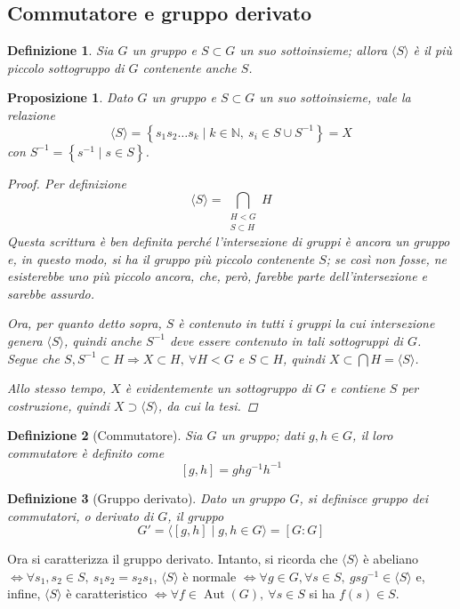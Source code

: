 \documentclass[12pt]{scrartcl}
\theoremstyle{style}
\newtheorem{definizione}{Definizione}[section]
\newtheorem{prop}{Proposizione}[section]
\numberwithin{equation}{subsection}
\begin{document}
\subsection{Commutatore e gruppo derivato}


\begin{definizione}
	Sia $G$ un gruppo e $S \subset G$ un suo sottoinsieme; allora $\langle S \rangle$ \`e il pi\`u piccolo sottogruppo di $G$ contenente anche $S$.
\end{definizione}
\begin{prop}
	Dato $G$ un gruppo e $S \subset G$ un suo sottoinsieme, vale la relazione
	\[
	\langle S \rangle= \left\{ s_1s_2 \ldots s_k  \mid k \in \mathbb{N}, \ s_i \in S \cup S^{-1} \right\} = X
	\] 
	con $S^{-1}= \left\{ s^{-1}  \mid  s \in S \right\} $.
	\begin{proof}
		Per definizione
		\[
			\langle S \rangle= \bigcap_{\substack{H < G \\ S \subset H}} H
		\] 
		Questa scrittura \`e ben definita perch\'e l'intersezione di gruppi \`e ancora un gruppo e, in questo modo, si ha il gruppo pi\`u piccolo contenente $S$; se cos\`i non fosse, ne esisterebbe uno pi\`u piccolo ancora, che, per\`o, farebbe parte dell'intersezione e sarebbe assurdo.

		Ora, per quanto detto sopra, $S$ \`e contenuto in tutti i gruppi la cui intersezione genera $\langle S \rangle$, quindi anche $S^{-1} $ deve essere contenuto in tali sottogruppi di $G$.
		Segue che $S,S^{-1}\subset H \Rightarrow X \subset H, \ \forall H < G$ e $S \subset H$, quindi $X \subset \bigcap H = \langle S \rangle$.

		Allo stesso tempo, $X$ \`e evidentemente un sottogruppo di $G$ e contiene $S$ per costruzione, quindi $X \supset \langle S \rangle$, da cui la tesi.
	\end{proof}
\end{prop}
\begin{definizione}
	[Commutatore]
	Sia $G$ un gruppo; dati $g,h \in G$, il loro \textit{commutatore} \`e definito come
	\[
		[g,h] = ghg^{-1} h^{-1}
	\] 
\end{definizione}
\begin{definizione}
	[Gruppo derivato]
	Dato un gruppo $G$, si definisce \textit{gruppo dei commutatori}, o \textit{derivato} di $G$, il gruppo 
	\[
		G ' = \langle [g,h]  \mid g,h \in G \rangle = [G:G]
	\] 
\end{definizione}
\noindent Ora si caratterizza il gruppo derivato.
Intanto, si ricorda che $\langle S \rangle$ \`e abeliano $\iff \forall s_1,s_2\in S , \  s_1s_2=s_2s_1$, $\langle S \rangle$ \`e normale $\iff \forall g \in G, \forall s \in S, \ gsg^{-1} \in \langle S \rangle$ e, infine, $\langle S \rangle$ \`e caratteristico $\iff \forall f \in \operatorname{Aut} (G) ,\ \forall s \in S$ si ha $f(s) \in S$.
\end{document}
